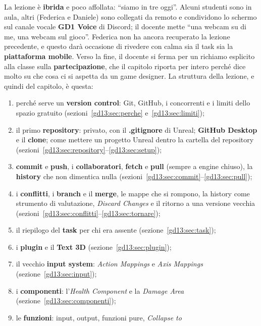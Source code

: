 La lezione è \textbf{ibrida} e poco affollata: ``siamo in tre oggi''. Alcuni
studenti sono in aula, altri (Federica e Daniele) sono collegati da remoto e
condividono lo schermo sul canale vocale \textbf{GD1 Voice} di Discord; il
docente mette ``una webcam su di me, una webcam sul gioco''. Federica non ha
ancora recuperato la lezione precedente, e questo darà occasione di rivedere
con calma sia il task sia la \textbf{piattaforma mobile}. Verso la fine, il
docente si ferma per un richiamo esplicito alla classe sulla
\textbf{partecipazione}, che il capitolo riporta per intero perché dice molto
su che cosa ci si aspetta da un game designer. La struttura della lezione, e
quindi del capitolo, è questa:
\begin{enumerate}
  \item perché serve un \textbf{version control}: Git, GitHub, i concorrenti e
        i limiti dello spazio gratuito (sezioni~\ref{gd13:sec:perche}
        e~\ref{gd13:sec:limiti});
  \item il primo \textbf{repository}: privato, con il \textbf{.gitignore} di
        Unreal; \textbf{GitHub Desktop} e il \textbf{clone}; come mettere un
        progetto Unreal dentro la cartella del repository
        (sezioni~\ref{gd13:sec:repository}--\ref{gd13:sec:setup});
  \item \textbf{commit} e \textbf{push}, i \textbf{collaboratori}, \textbf{fetch}
        e \textbf{pull} (sempre a engine chiuso), la \textbf{history} che non
        dimentica nulla (sezioni~\ref{gd13:sec:commit}--\ref{gd13:sec:pull});
  \item i \textbf{conflitti}, i \textbf{branch} e il \textbf{merge}, le mappe che
        si rompono, la history come strumento di valutazione, \emph{Discard
        Changes} e il ritorno a una versione vecchia
        (sezioni~\ref{gd13:sec:conflitti}--\ref{gd13:sec:tornare});
  \item il riepilogo del \textbf{task} per chi era assente
        (sezione~\ref{gd13:sec:task});
  \item i \textbf{plugin} e il \textbf{Text 3D} (sezione~\ref{gd13:sec:plugin});
  \item il vecchio \textbf{input system}: \emph{Action Mappings} e \emph{Axis
        Mappings} (sezione~\ref{gd13:sec:input});
  \item i \textbf{componenti}: l'\emph{Health Component} e la \emph{Damage
        Area} (sezione~\ref{gd13:sec:componenti});
  \item le \textbf{funzioni}: input, output, funzioni pure, \emph{Collapse to
}
\end{enumerate}
